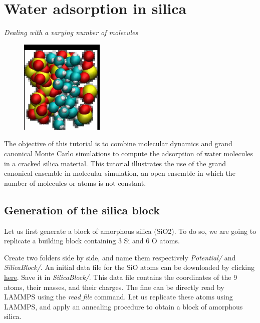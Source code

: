 \chapter{Water adsorption in silica}

\vspace{-1cm} \noindent \textcolor{graytitle}{\textit{{\Large Dealing with a varying number of molecules}}\vspace{0.5cm} }

\noindent \hspace{-0.45cm}\begin{figure}
\includegraphics[width=4cm]{tutorials/level3/water-adsorption-in-silica/avatar-light.png}
\end{figure}

\noindent The objective of this tutorial is to combine molecular
dynamics and grand canonical Monte Carlo simulations to
compute the adsorption of water molecules in a cracked silica material.
This tutorial illustrates the use of the grand canonical
ensemble in molecular simulation, an open ensemble in which the number of 
molecules or atoms is not constant.

\section{Generation of the silica block}

\noindent Let us first generate a block of amorphous silica (SiO2). To do
so, we are going to replicate a building block containing 3
Si and 6 O atoms. 

Create two folders side by side, and name them respectively \textit{Potential/}
and \textit{SilicaBlock/}.
An initial data file for the SiO atoms can be
downloaded by clicking \href{../../../../../inputs/level3/water-adsorption-in-silica/SilicaBlock/SiO.data}{here}.
Save it in \textit{SilicaBlock/}. This data file
contains the coordinates of the 9 atoms, their masses, and
their charges. The fine can be directly read by LAMMPS using the
\textit{read$\_$file} command. Let us replicate these atoms using
LAMMPS, and apply an annealing procedure to obtain a block
of amorphous silica.

